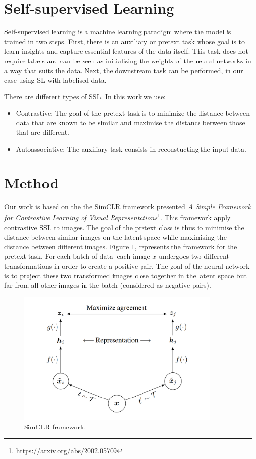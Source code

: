 \documentclass{article}
\begin{document}
\section{Self-supervised Learning}
Self-supervised learning is a machine learning paradigm where the model is trained in two steps. First, there is an auxiliary or pretext task whose goal is to learn insights and capture essential features of the data itself. This task does not require labels and can be seen as initialising the weights of the neural networks in a way that suits the data. Next, the downstream task can be performed, in our case using SL with labelised data.

There are different types of SSL. In this work we use:
\begin{itemize}
    \item Contrastive: The goal of the pretext task is to minimize the distance between data that are known to be similar and maximise the distance between those that are different.
    \item Autoassociative: The auxiliary task consists in reconstucting the input data.
\end{itemize}

\section{Method}
Our work is based on the the SimCLR framework presented \textit{A Simple Framework for Contrastive Learning of Visual Representations}\footnote{\url{https://arxiv.org/abs/2002.05709}}. This framework apply contrastive SSL to images. The goal of the pretext class is thus to minimise the distance between similar images on the latent space while maximising the distance between different images. Figure \ref{simclr}, represents the framework for the pretext task. For each batch of data, each image \(x\) undergoes two different transformations in order to create a positive pair. The goal of the neural network is to project these two transformed images close together in the latent space but far from all other images in the batch (considered as negative pairs).

\begin{figure}[]
    \centering
    \includegraphics[width=10cm]{img/simclr.png}
    \caption{SimCLR framework.}
    \label{simclr}
\end{figure}
\end{document}
